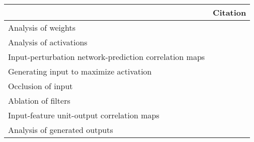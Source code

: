 \begin{tabular}{ll}
\toprule
{} &                                                                                                                                                                                          Citation \\
\midrule
Analysis of weights                                    &  \cite{Perez-Benitez2018, Yoon2018, Langkvist2018, Deiss2018, Lawhern2018, Xu2016, Tsinalis2016a, Nurse2016, Tabar2016a, Zheng2015, Stober2015, Manor2015, Yang2015a, Langkvist2012, Cecotti2011} \\
Analysis of activations                                &                                                                                           \cite{Yuan2018a, Waytowich2018, Lawhern2018, kwak2017, Yin2017a, Supratak2017, Shamwell2016, Manor2015} \\
Input-perturbation network-prediction correlation maps &                                                                                                              \cite{Schirrmeister2017a, Volker2018, Hartmann2018b, Behncke2017, Schirrmeister2017} \\
Generating input to maximize activation                &                                                                                                                                      \cite{VanPutten2018b, Ruffini2018a, Sors2018, Bashivan2016a} \\
Occlusion of input                                     &                                                                                                                                                        \cite{Lee2018, Chambon2018, Thodoroff2016} \\
Ablation of filters                                    &                                                                                                                                                                                \cite{Lawhern2018} \\
Input-feature unit-output correlation maps             &                                                                                                                                                                          \cite{Schirrmeister2017} \\
Analysis of generated outputs                          &                                                                                                                                                                               \cite{Hartmann2018} \\

\end{tabular}

